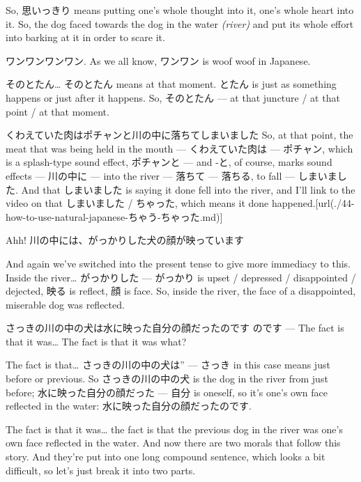 So, 思いっきり means putting one's whole thought into it, one's whole heart into it. So, the dog faced towards the dog in the water {\em (river)} and put its whole effort into barking at it in order to scare it.

ワンワンワンワン. As we all know, ワンワン is woof woof in Japanese.

{}

そのとたん\ldots{} そのとたん means at that moment. とたん is just as something happens or just after it happens. So, そのとたん --- at that juncture / at that point / at that moment.

くわえていた肉はポチャンと川の中に落ちてしまいました So, at that point, the meat that was being held in the mouth --- くわえていた肉は --- ポチャン, which is a splash-type sound effect, ポチャンと --- and -と, of course, marks sound effects --- 川の中に --- into the river --- 落ちて --- 落ちる, to fall --- しまいました. And that しまいました is saying it done fell into the river, and I'll link to the video on that しまいました / ちゃった, which means it done happened.\goto{{[}44{]}}[url(./44-how-to-use-natural-japanese-ちゃう-ちゃった.md)]

Ahh! 川の中には、がっかりした犬の顔が映っています

{}

And again we've switched into the present tense to give more immediacy to this. Inside the river\ldots{} がっかりした --- がっかり is upset / depressed / disappointed / dejected, 映る is reflect, 顔 is face. So, inside the river, the face of a disappointed, miserable dog was reflected.

さっきの川の中の犬は水に映った自分の顔だったのです のです --- The fact is that it was\ldots{} The fact is that it was what?

The fact is that\ldots{} さっきの川の中の犬は” --- さっき in this case means just before or previous. So さっきの川の中の犬 is the dog in the river from just before; 水に映った自分の顔だった --- 自分 is oneself, so it's one's own face reflected in the water: 水に映った自分の顔だったのです.

The fact is that it was\ldots{} the fact is that the previous dog in the river was one's own face reflected in the water. And now there are two morals that follow this story. And they're put into one long compound sentence, which looks a bit difficult, so let's just break it into two parts.

{}

